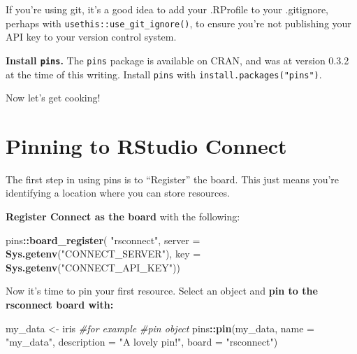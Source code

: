 \documentclass[
  twocolumn]{article}
\newenvironment{Shaded}{\begin{snugshade}}{\end{snugshade}}
\newcommand{\CommentTok}[1]{\textcolor[rgb]{0.56,0.35,0.01}{\textit{#1}}}
\newcommand{\DataTypeTok}[1]{\textcolor[rgb]{0.13,0.29,0.53}{#1}}
\newcommand{\KeywordTok}[1]{\textcolor[rgb]{0.13,0.29,0.53}{\textbf{#1}}}
\newcommand{\NormalTok}[1]{#1}
\newcommand{\OperatorTok}[1]{\textcolor[rgb]{0.81,0.36,0.00}{\textbf{#1}}}
\newcommand{\StringTok}[1]{\textcolor[rgb]{0.31,0.60,0.02}{#1}}
\begin{document}
If you're using git, it's a good idea to add your .RProfile to your
.gitignore, perhaps with \texttt{usethis::use\_git\_ignore()}, to ensure
you're not publishing your API key to your version control system.

\textbf{Install \texttt{pins}.} The \texttt{pins} package is available
on CRAN, and was at version 0.3.2 at the time of this writing. Install
\texttt{pins} with \texttt{install.packages("pins")}.

Now let's get cooking! 🍳

\hypertarget{pinning-to-rstudio-connect}{%
\section{Pinning to RStudio Connect}\label{pinning-to-rstudio-connect}}

The first step in using pins is to ``Register'' the board. This just
means you're identifying a location where you can store resources.

\textbf{Register Connect as the board} with the following:
\vspace{-4truemm}

\begin{Shaded}
\begin{Highlighting}[]
\NormalTok{pins}\OperatorTok{::}\KeywordTok{board_register}\NormalTok{(}
    \StringTok{"rsconnect"}\NormalTok{, }
    \DataTypeTok{server =} \KeywordTok{Sys.getenv}\NormalTok{(}\StringTok{"CONNECT_SERVER"}\NormalTok{), }
    \DataTypeTok{key =} \KeywordTok{Sys.getenv}\NormalTok{(}\StringTok{"CONNECT_API_KEY"}\NormalTok{))}
\end{Highlighting}
\end{Shaded}

Now it's time to pin your first resource. Select an object and
\textbf{pin to the rsconnect board with:} \vspace{-4truemm}

\begin{Shaded}
\begin{Highlighting}[]
\NormalTok{my_data <-}\StringTok{ }\NormalTok{iris }\CommentTok{#for example}
\CommentTok{#pin object}
\NormalTok{pins}\OperatorTok{::}\KeywordTok{pin}\NormalTok{(my_data, }
    \DataTypeTok{name =} \StringTok{"my_data"}\NormalTok{,}
    \DataTypeTok{description =} \StringTok{"A lovely pin!"}\NormalTok{,}
    \DataTypeTok{board =} \StringTok{"rsconnect"}\NormalTok{)}
\end{Highlighting}
\end{Shaded}
\end{document}
